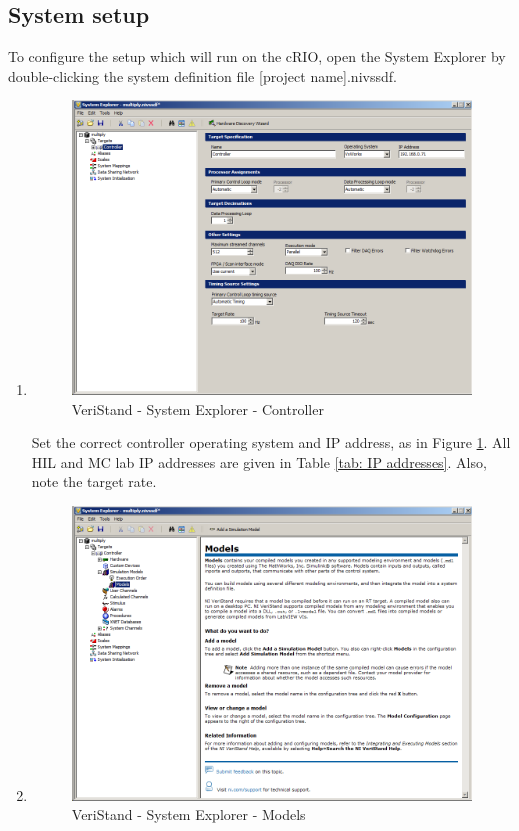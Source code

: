 \documentclass[a4paper,twoside,english]{report}
\begin{document}
\subsection{\label{subsec: Veristand System-setup}System setup}

To configure the setup which will run on the cRIO, open the System
Explorer by double-clicking the system definition file {[}project
name{]}.nivssdf.
\begin{enumerate}
\item 
\begin{figure}[h]
\centering \includegraphics[scale=0.45]{fig/veristand_systemexplorer_ip}
\caption{VeriStand - System Explorer - Controller}

\label{fig: veristand system explorer ip} 
\end{figure}
 Set the correct controller operating system and IP address, as in
Figure \ref{fig: veristand system explorer ip}. All HIL and MC lab
IP addresses are given in Table \ref{tab: IP addresses}. Also, note
the target rate.
\item 
\begin{figure}[h]
\centering \includegraphics[scale=0.45]{fig/veristand_systemexplorer}
\caption{VeriStand - System Explorer - Models}


\end{figure}
\end{enumerate}
\end{document}
